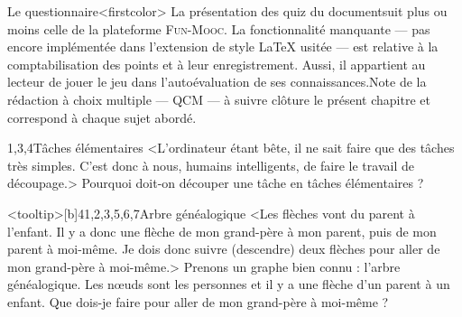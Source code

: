Le questionnaire\caution[t]<firstcolor>{%
La présentation des quiz du document\linebreak suit plus ou moins celle de la platefor\-me \textsc{Fun-Mooc}. La fonctionnalité manquante --- pas encore implémentée dans l'extension de style \LaTeX{} usitée --- est relative à la comptabilisation des points et à leur enregistrement. Aussi, il appartient au lecteur de jouer le jeu dans l'auto\-évaluation de ses connaissances.}{Note de la rédaction}
à choix multiple%
--- QCM --- à suivre clôture le présent chapitre  et correspond à chaque sujet abordé.
\parnotes

\vspace{6pt}

\begin{quiz}[title={Décomposition en tâches}]
\begin{quizquestion*}[b]{2}{1,3,4}{Tâches élémentaires}
<L'ordinateur étant bête, il ne sait faire que des tâches très simples. C'est donc à nous, humains intelligents, de faire le travail de découpage.>
Pourquoi doit-on découper une tâche en tâches élémentaires ?
\end{quizquestion*}

%
\begin{quizquestion*}<tooltip>[b]{4}{1,2,3,5,6,7}{Arbre généalogique}
<Les flèches vont du parent à l'enfant. Il y a donc une flèche de mon grand-père à mon parent, puis de mon parent à moi-même. Je dois donc suivre (descendre) deux flèches pour aller de mon grand-père à moi-même.>
Prenons un graphe bien connu : l'arbre généalogique. Les nœuds sont les personnes et il y a une flèche d'un parent à un enfant. Que dois-je faire pour aller de mon grand-père à moi-même ?
\end{quizquestion*}
\end{quiz}


